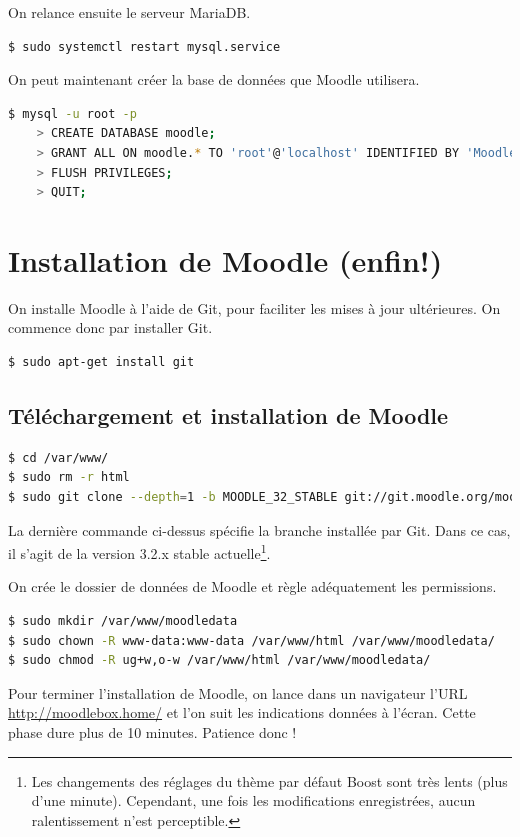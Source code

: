 \documentclass[11pt]{article}
\begin{document}
On relance ensuite le serveur MariaDB.
\begin{lstlisting}[language=bash]
$ sudo systemctl restart mysql.service
\end{lstlisting}

On peut maintenant créer la base de données que Moodle utilisera.

\begin{lstlisting}[language=bash]
$ mysql -u root -p
    > CREATE DATABASE moodle;
    > GRANT ALL ON moodle.* TO 'root'@'localhost' IDENTIFIED BY 'Moodlebox4$';
    > FLUSH PRIVILEGES;
    > QUIT;
\end{lstlisting}

\section{Installation de Moodle (enfin!)}

On installe Moodle à l'aide de Git, pour faciliter les mises à jour ultérieures. On commence donc par installer Git.

\begin{lstlisting}[language=bash]
$ sudo apt-get install git
\end{lstlisting}

\subsection{Téléchargement et installation de Moodle}

\begin{lstlisting}[language=bash]
$ cd /var/www/
$ sudo rm -r html
$ sudo git clone --depth=1 -b MOODLE_32_STABLE git://git.moodle.org/moodle.git html
\end{lstlisting}
La dernière commande ci-dessus spécifie la branche installée par Git. Dans ce cas, il s'agit de la version 3.2.x stable actuelle\footnote{Les changements des réglages du thème par défaut Boost sont très lents (plus d'une minute). Cependant, une fois les modifications enregistrées, aucun ralentissement n'est perceptible.}.

On crée le dossier de données de Moodle et règle adéquatement les permissions.
\begin{lstlisting}[language=bash]
$ sudo mkdir /var/www/moodledata
$ sudo chown -R www-data:www-data /var/www/html /var/www/moodledata/
$ sudo chmod -R ug+w,o-w /var/www/html /var/www/moodledata/
\end{lstlisting}

Pour terminer l'installation de Moodle, on lance dans un navigateur l'URL \url{http://moodlebox.home/} et l'on suit les indications données à l'écran. Cette phase dure plus de 10 minutes. Patience donc !
\end{document}
